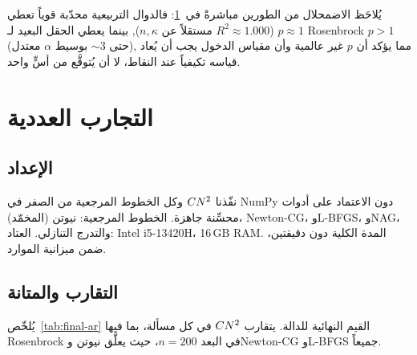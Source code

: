 يُلاحَظ الاضمحلال من الطورين مباشرةً في~\ref{sec:exp-ar}: فالدوال التربيعية محدّبة
قوياً تعطي $p\approx1$ ($R^2\approx1.000$ مستقلاً عن $n,\kappa$), بينما يعطي الحقل
البعيد لـ Rosenbrock $p>1$ (حتى $\sim3$ بوسيط $\alpha$ معتدل), مما يؤكد أن $p$ غير
عالمية وأن مقياس الدخول يجب أن يُعاد قياسه تكيفياً عند النقاط، لا أن يُتوقَّع من أسٍّ واحد.

\section{التجارب العددية}
\label{sec:exp-ar}

\subsection{الإعداد}
نفّذنا $CN^2$ وكل الخطوط المرجعية من الصفر في NumPy دون الاعتماد على أدوات محسِّنة جاهزة.
الخطوط المرجعية: نيوتن (المخمّد)، Newton-CG، وL-BFGS، وNAG، والتدرج التنازلي.
العتاد: Intel i5-13420H، 16\,GB RAM. المدة الكلية دون دقيقتين، ضمن ميزانية الموارد.

\subsection{التقارب والمتانة}
يُلخّص~\ref{tab:final-ar} القيم النهائية للدالة. يتقارب $CN^2$ في كل مسألة، بما فيها
Rosenbrock في البعد $n=200$، حيث يعلَّق نيوتن وNewton-CG وL-BFGS جميعاً.

